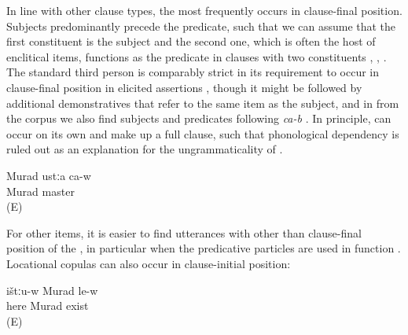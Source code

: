 In line with other clause types, the  most frequently occurs in clause-final position. Subjects predominantly precede the predicate, such that we can assume that the first  constituent is the  subject and the second one, which is often the host of enclitical  items, functions as the predicate in clauses with two  constituents , , . The standard third person   is comparably strict in its requirement to occur in clause-final position in elicited assertions , though it might be followed by additional demonstratives that refer to the same item as the subject, and in  from the corpus we also find  subjects and predicates following \textit{ca-b} . In principle,  can occur on its own and make up a full clause, such that phonological dependency is ruled out as an explanation for the ungrammaticality of . 


\begin{exe}
	\ex	\label{ex:Murad is a / the master}
	\begin{xlist}
		\ex	\label{ex:Murad is a / the master@A}
		\gll	Murad	ustːa ca-w\\
			Murad master \\
		\glt	{} (E)
	
		 \label{ex:Murad is a / the master@B}
		 \label{ex:Murad is a / the master@C}
	\end{xlist}
\end{exe}

For other  items, it is easier to find utterances with other than clause-final position of the , in particular when the predicative particles are used in  function . Locational copulas can also occur in clause-initial position:

\begin{exe}
	\ex	\label{ex:Murad is here}
	\begin{xlist}
		\ex	\label{ex:Murad is here@A}
		\gll	ištːu-w	Murad	le-w\\
			here	Murad	exist\tsc{-m}\\
		\glt	\sqt{Murad is here.} (E)
	
		\ex	{}	\label{ex:Murad is here@B}
	\end{xlist}
\end{exe}

